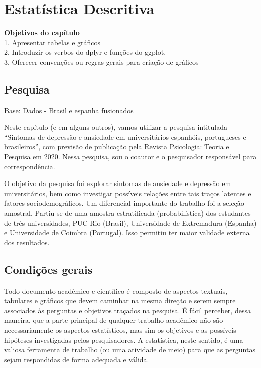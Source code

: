 \documentclass[
]{book}
\begin{document}
\hypertarget{estatuxedstica-descritiva}{%
\chapter{Estatística Descritiva}\label{estatuxedstica-descritiva}}

\begin{objectives}
\textbf{Objetivos do capítulo}\\
1. Apresentar tabelas e gráficos\\
2. Introduzir os verbos do dplyr e funções do ggplot.\\
3. Oferecer convenções ou regras gerais para criação de gráficos
\end{objectives}

\hypertarget{pesquisa}{%
\section{Pesquisa}\label{pesquisa}}

\begin{alert}

Base: Dados - Brasil e espanha fusionados

\end{alert}

Neste capítulo (e em alguns outros), vamos utilizar a pesquisa intitulada ``Sintomas de depressão e ansiedade em universitários espanhóis, portugueses e brasileiros'', com previsão de publicação pela Revista Psicologia: Teoria e Pesquisa em 2020. Nessa pesquisa, sou o coautor e o pesquisador responsável para correspondência.

O objetivo da pesquisa foi explorar sintomas de ansiedade e depressão em universitários, bem como investigar possíveis relações entre tais traços latentes e fatores sociodemográficos. Um diferencial importante do trabalho foi a seleção amostral. Partiu-se de uma amostra estratificada (probabilística) dos estudantes de três universidades, PUC-Rio (Brasil), Universidade de Extremadura (Espanha) e Universidade de Coimbra (Portugal). Isso permitiu ter maior validade externa dos resultados.

\hypertarget{condiuxe7uxf5es-gerais}{%
\section{Condições gerais}\label{condiuxe7uxf5es-gerais}}

Todo documento acadêmico e científico é composto de aspectos textuais, tabulares e gráficos que devem caminhar na mesma direção e serem sempre associados às perguntas e objetivos traçados na pesquisa. É fácil perceber, dessa maneira, que a parte principal de qualquer trabalho acadêmico não são necessariamente os aspectos estatísticos, mas sim os objetivos e as possíveis hipóteses investigadas pelos pesquisadores. A estatística, neste sentido, é uma valiosa ferramenta de trabalho (ou uma atividade de meio) para que as perguntas sejam respondidas de forma adequada e válida.
\end{document}
